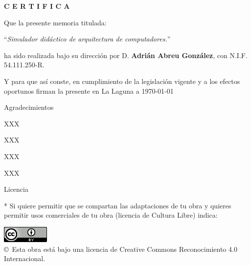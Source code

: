 \documentclass[spanish,a4paper,14pt,oneside]{extreport}
\begin{document}
\bigskip
\bigskip
{\bf C E R T I F I C A}

\bigskip
\bigskip
\bigskip
Que la presente memoria titulada:

\bigskip
``{\it Simulador didáctico de arquitectura de computadores.}''

\bigskip
\bigskip
\bigskip

\noindent ha sido realizada bajo su dirección por D. {\bf Adrián Abreu González},
con N.I.F. 54.111.250-R.

\bigskip
\bigskip

Y para que así conste, en cumplimiento de la legislación vigente y a los efectos
oportunos firman la presente en La Laguna a \today

\newpage
\thispagestyle{empty}

{ \flushright

\begin{LARGE}
Agradecimientos
\end{LARGE}

\hspace{3mm}

\begin{large}


\hspace{3mm}
XXX

\hspace{3mm}
XXX


\hspace{3mm}
XXX


\hspace{3mm}
XXX


\end{large}

}

\newpage

\begin{huge}
Licencia
\end{huge}

\bigskip
* Si quiere permitir que se compartan las adaptaciones de tu obra
y quieres permitir usos comerciales de tu obra (licencia de Cultura Libre) indica:

\begin{center}
\includegraphics[scale=1.5]{images/by_88x31}\\[10mm]
{\Large \copyright~Esta obra está bajo una licencia de Creative Commons Reconocimiento 4.0 Internacional.
}
\end{center}
\end{document}
